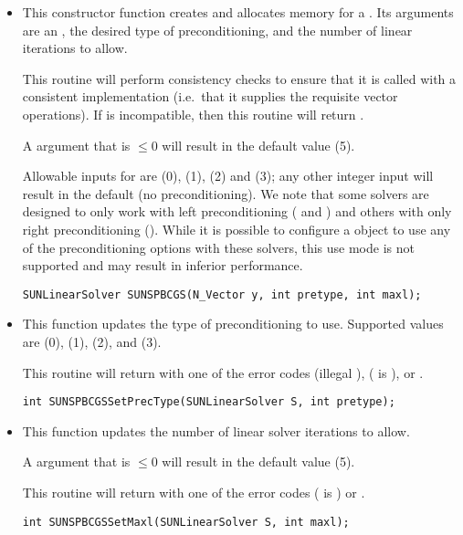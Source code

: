 \begin{itemize}


\item {}

  This constructor function creates and allocates memory for a {\spbcg}
  .  Its arguments are an {\nvector}, the desired
  type of preconditioning, and the number of linear iterations to allow.

  This routine will perform consistency checks to ensure that it is
  called with a consistent {\nvector} implementation (i.e.~that it
  supplies the requisite vector operations).  If  is
  incompatible, then this routine will return .

  A  argument that is $\le0$ will result in the default
  value (5).

  Allowable inputs for  are  (0),
   (1),  (2) and  (3);
  any other integer input will result in the default (no
  preconditioning).
  We note that some {\sundials} solvers are designed to only work
  with left preconditioning ({\ida} and {\idas}) and others with only
  right preconditioning ({\kinsol}). While it is possible to configure
  a {\sunlinsolspbcgs} object to use any of the preconditioning options
  with these solvers, this use mode is not supported and may result in
  inferior performance.

  \verb|SUNLinearSolver SUNSPBCGS(N_Vector y, int pretype, int maxl);|


\item {}

  This function updates the type of preconditioning to use.  Supported
  values are  (0),  (1),
   (2), and  (3).  

  This routine will return with one of the error codes
   (illegal ), 
  ( is ), or .
  
  \verb|int SUNSPBCGSSetPrecType(SUNLinearSolver S, int pretype);|


\item {}

  This function updates the number of linear solver iterations to allow.  

  A  argument that is $\le0$ will result in the default
  value (5).

  This routine will return with one of the error codes
   ( is ) or .
  
  \verb|int SUNSPBCGSSetMaxl(SUNLinearSolver S, int maxl);|

\end{itemize}
